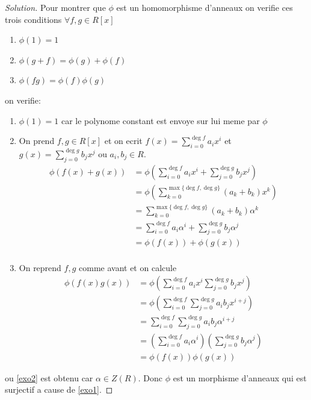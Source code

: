 \documentclass[a4paper,12pt,french]{report}
\theoremstyle{plain}
\theoremstyle{definition}
\begin{document}
\begin{proof}[Solution]
Pour montrer que $\phi$ est un homomorphisme d'anneaux on verifie ces trois conditions $\forall f,g\in R[x]$
\begin{enumerate}
\item $\phi(1)=1$
\item $\phi(g+f)=\phi(g)+\phi(f)$
\item $\phi(fg)=\phi(f)\phi(g)$
\end{enumerate}
on verifie:
\begin{enumerate}
\item $\phi(1)=1$ car le polynome constant est envoye sur lui meme par $\phi$
\item \label{exo1} On prend $f,g\in R[x]$ et on ecrit $f(x)=\sum_{i=0}^{\deg f}a_{i}x^{i}$ et $g(x)=\sum_{j=0}^{\deg g}b_{j}x^{j}$ ou $a_{i},b_{j}\in R$. 
\begin{align}
\phi(f(x)+g(x)) & =\phi\left( \sum_{i=0}^{\deg f} a_{i}x^{i}+\sum_{j=0}^{\deg g} b_{j}x^{j}  \right) \\
 & =\phi\left( \sum_{k=0}^{\max\{ \deg f,\deg g \}} (a_{k}+b_{k})x^{k} \right) \\
 & =\sum_{k=0}^{\max\{ \deg f,\deg g \}}(a_{k}+b_{k})\alpha^{k} \\
 & =\sum_{i=0}^{\deg f} a_{i}\alpha^{i}+\sum_{j=0}^{\deg g} b_{j}\alpha^{j}  \\
 & =\phi(f(x))+\phi(g(x)) \\
\end{align}
\item On reprend $f,g$ comme avant et on calcule 
\begin{align}
\phi(f(x)g(x)) & =\phi\left( \sum_{i=0}^{\deg f} a_{i}x^{i} \sum_{j=0}^{\deg g} b_{j}x^{j} \right) \\
 & =\phi\left( \sum_{i=0}^{\deg f} \sum_{j=0}^{\deg g} a_{i}b_{j}x^{i+j} \right) \\
 & =\sum_{i=0}^{\deg f} \sum_{j=0}^{\deg g} a_{i}b_{j}\alpha^{i+j} \label{exo2}\\
 & =\left( \sum_{i=0}^{\deg f } a_{i}\alpha^{i} \right)\left( \sum_{j=0}^{\deg g } b_{j}\alpha^{j} \right) \\
 & =\phi(f(x))\phi(g(x))
\end{align}
\end{enumerate}
ou \ref{exo2} est obtenu car $\alpha \in Z(R)$. Donc $\phi$ est un morphisme d'anneaux qui est surjectif a cause de \ref{exo1}.


\end{proof}
\end{document}
